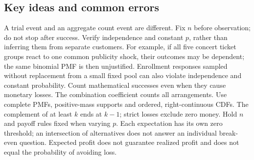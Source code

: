 \subsection*{Key ideas and common errors}
A trial event and an aggregate count event are different. Fix $n$ before observation;
do not stop after success. Verify independence and constant $p$, rather than inferring them from separate customers.
For example, if all five concert ticket groups react to one common publicity shock, their outcomes may be dependent;
the same binomial PMF is then unjustified. Enrollment responses sampled without replacement from a small fixed pool can also violate independence and constant probability.
Count mathematical successes even when they cause monetary losses. The combination coefficient counts all arrangements.
Use complete PMFs, positive-mass supports and ordered, right-continuous CDFs.
The complement of at least $k$ ends at $k-1$; strict losses exclude zero money.
Hold $n$ and payoff rules fixed when varying $p$. Each expectation has its own zero threshold;
an intersection of alternatives does not answer an individual break-even question.
Expected profit does not guarantee realized profit and does not equal the probability of avoiding loss.

